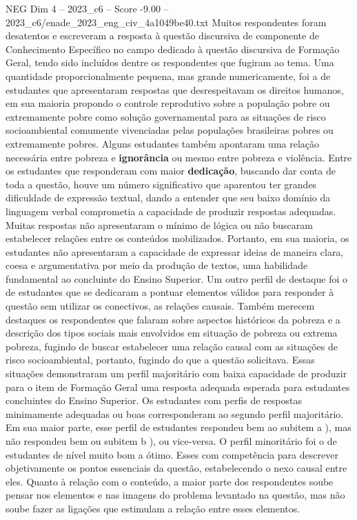 \begin{textsample}{NEG Dim 4 – 2023\_c6 – Score -9.00 – 2023\_c6/enade\_2023\_eng\_civ\_4a1049be40.txt}
Muitos respondentes foram desatentos e escreveram a resposta à questão discursiva de componente de Conhecimento Específico no campo dedicado à questão discursiva de Formação Geral, tendo sido incluídos dentre os respondentes que fugiram ao tema.
Uma quantidade proporcionalmente pequena, mas grande numericamente, foi a de estudantes que apresentaram respostas que desrespeitavam os direitos humanos, em sua maioria propondo o controle reprodutivo sobre a população pobre ou extremamente pobre como solução governamental para as situações de risco socioambiental comumente vivenciadas pelas populações brasileiras pobres ou extremamente pobres.
Alguns estudantes também apontaram uma relação necessária entre pobreza e \textbf{ignorância} ou mesmo entre pobreza e violência.
Entre os estudantes que responderam com maior \textbf{dedicação}, buscando dar conta de toda a questão, houve um número significativo que aparentou ter grandes dificuldade de expressão textual, dando a entender que seu baixo domínio da linguagem verbal comprometia a capacidade de produzir respostas adequadas.
Muitas respostas não apresentaram o mínimo de lógica ou não buscaram estabelecer relações entre os conteúdos mobilizados.
Portanto, em sua maioria, os estudantes não apresentaram a capacidade de expressar ideias de maneira clara, coesa e argumentativa por meio da produção de textos, uma habilidade fundamental ao concluinte do Ensino Superior.
Um outro perfil de destaque foi o de estudantes que se dedicaram a pontuar elementos válidos para responder à questão sem utilizar os conectivos, as relações causais.
Também merecem destaques os respondentes que falaram sobre aspectos históricos da pobreza e a descrição dos tipos sociais mais envolvidos em situação de pobreza ou extrema pobreza, fugindo de buscar estabelecer uma relação causal com as situações de risco socioambiental, portanto, fugindo do que a questão solicitava.
Essas situações demonstraram um perfil majoritário com baixa capacidade de produzir para o item de Formação Geral uma resposta adequada esperada para estudantes concluintes do Ensino Superior.
Os estudantes com perfis de respostas minimamente adequadas ou boas corresponderam ao segundo perfil majoritário.
Em sua maior parte, esse perfil de estudantes respondeu bem ao subitem a ), mas não respondeu bem ou subitem b ), ou vice-versa.
O perfil minoritário foi o de estudantes de nível muito bom a ótimo.
Esses com competência para descrever objetivamente os pontos essenciais da questão, estabelecendo o nexo causal entre eles.
Quanto à relação com o conteúdo, a maior parte dos respondentes soube pensar nos elementos e nas imagens do problema levantado na questão, mas não soube fazer as ligações que estimulam a relação entre esses elementos.

\end{textsample}
